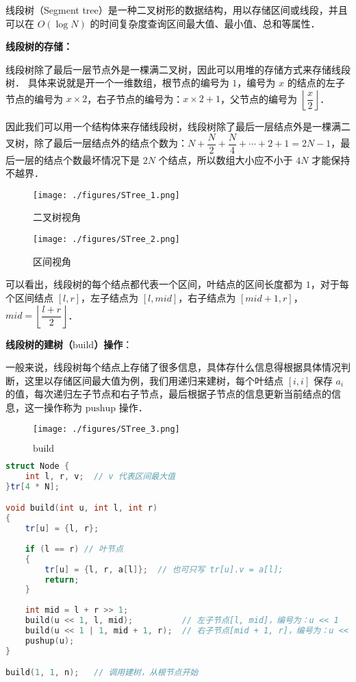 
线段树（Segment tree）是一种二叉树形的数据结构，用以存储区间或线段，并且可以在 $O(\log N)$ 的时间复杂度查询区间最大值、最小值、总和等属性．

\textbf{线段树的存储：}

线段树除了最后一层节点外是一棵满二叉树，因此可以用堆的存储方式来存储线段树．
具体来说就是开一个一维数组，根节点的编号为 $1$，编号为 $x$ 的结点的左子节点的编号为 $x \times 2$，右子节点的编号为：$x \times 2 + 1$，父节点的编号为 $\left\lfloor\dfrac{x}{2}\right\rfloor$．

因此我们可以用一个结构体来存储线段树，线段树除了最后一层结点外是一棵满二叉树，除了最后一层结点外的结点个数为：$N + \dfrac{N}{2} + \dfrac{N}{4} + \cdots + 2 + 1 = 2N - 1$，最后一层的结点个数最坏情况下是 $2N$ 个结点，所以数组大小应不小于 $4N$ 才能保持不越界．

\begin{figure}[ht]
\centering
\texttt{[image: ./figures/STree\_1.png]}
\caption{二叉树视角} \label{STree_fig1}
\end{figure}

\begin{figure}[ht]
\centering
\texttt{[image: ./figures/STree\_2.png]}
\caption{区间视角} \label{STree_fig2}
\end{figure}


可以看出，线段树的每个结点都代表一个区间，叶结点的区间长度都为 $1$，对于每个区间结点 $[l, r]$，左子结点为 $[l, mid]$，右子结点为 $[mid + 1, r]$，$mid = \left\lfloor\dfrac{l+r}{2}\right\rfloor$．

\textbf{线段树的建树（$\text{build}$）操作}：

一般来说，线段树每个结点上存储了很多信息，具体存什么信息得根据具体情况判断，这里以存储区间最大值为例，我们用递归来建树，每个叶结点 $[i, i]$ 保存 $a_i$ 的值，每次递归左子节点和右子节点，最后根据子节点的信息更新当前结点的信息，这一操作称为 $\text{pushup}$ 操作．

\begin{figure}[ht]
\centering
\texttt{[image: ./figures/STree\_3.png]}
\caption{$\text{build}$} \label{STree_fig3}
\end{figure}


\begin{lstlisting}[language=cpp]
struct Node {
    int l, r, v;  // v 代表区间最大值
}tr[4 * N];

void build(int u, int l, int r) 
{
    tr[u] = {l, r};
    
    if (l == r) // 叶节点
    {
        tr[u] = {l, r, a[l]};  // 也可只写 tr[u].v = a[l];
        return;
    }
    
    int mid = l + r >> 1;
    build(u << 1, l, mid);          // 左子节点[l, mid]，编号为：u << 1
    build(u << 1 | 1, mid + 1, r);  // 右子节点[mid + 1, r]，编号为：u << 1 | 1
    pushup(u);
}

build(1, 1, n);   // 调用建树，从根节点开始
\end{lstlisting}


